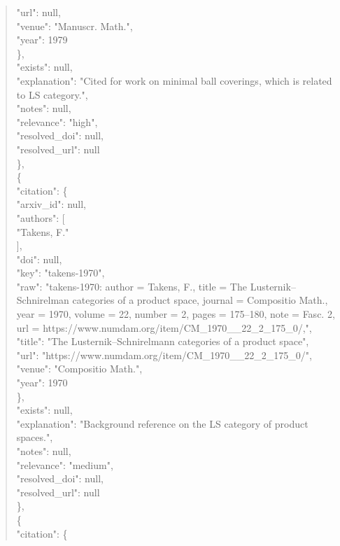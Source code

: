 \documentclass[11pt]{article}
\begin{document}
\begin{quote}
        "url": null,\\
        "venue": "Manuscr. Math.",\\
        "year": 1979\\
      \},\\
      "exists": null,\\
      "explanation": "Cited for work on minimal ball coverings, which is related to LS category.",\\
      "notes": null,\\
      "relevance": "high",\\
      "resolved\_doi": null,\\
      "resolved\_url": null\\
    \},\\
    \{\\
      "citation": \{\\
        "arxiv\_id": null,\\
        "authors": [\\
          "Takens, F."\\
        ],\\
        "doi": null,\\
        "key": "takens-1970",\\
        "raw": "takens-1970: author = Takens, F., title = The Lusternik--Schnirelman categories of a product space, journal = Compositio Math., year = 1970, volume = 22, number = 2, pages = 175--180, note = Fasc. 2, url = https://www.numdam.org/item/CM\_1970\_\_22\_2\_175\_0/,",\\
        "title": "The Lusternik--Schnirelmann categories of a product space",\\
        "url": "https://www.numdam.org/item/CM\_1970\_\_22\_2\_175\_0/",\\
        "venue": "Compositio Math.",\\
        "year": 1970\\
      \},\\
      "exists": null,\\
      "explanation": "Background reference on the LS category of product spaces.",\\
      "notes": null,\\
      "relevance": "medium",\\
      "resolved\_doi": null,\\
      "resolved\_url": null\\
    \},\\
    \{\\
      "citation": \{\\

\end{quote}
\end{document}
